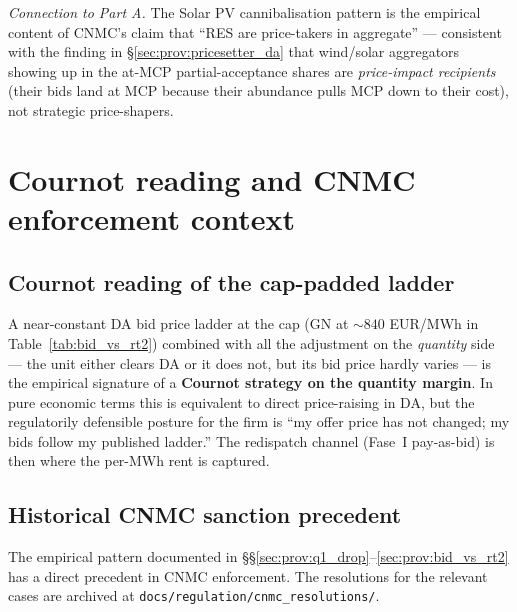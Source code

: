 \documentclass[11pt,a4paper]{article}
\begin{document}
\textit{Connection to Part A.} The Solar PV cannibalisation pattern is the empirical content of CNMC's claim that ``RES are price-takers in aggregate'' --- consistent with the finding in \S\ref{sec:prov:pricesetter_da} that wind/solar aggregators showing up in the at-MCP partial-acceptance shares are \emph{price-impact recipients} (their bids land at MCP because their abundance pulls MCP down to their cost), not strategic price-shapers.


\section{Cournot reading and CNMC enforcement context}\label{sec:prov:cournot_cnmc}

\subsection{Cournot reading of the cap-padded ladder}\label{sec:prov:cournot_cnmc:cournot}

A near-constant DA bid price ladder at the cap (GN at $\sim 840$ EUR/MWh in Table~\ref{tab:bid_vs_rt2}) combined with all the adjustment on the \emph{quantity} side --- the unit either clears DA or it does not, but its bid price hardly varies --- is the empirical signature of a \textbf{Cournot strategy on the quantity margin}. In pure economic terms this is equivalent to direct price-raising in DA, but the regulatorily defensible posture for the firm is ``my offer price has not changed; my bids follow my published ladder.'' The redispatch channel (Fase~I pay-as-bid) is then where the per-MWh rent is captured.

\subsection{Historical CNMC sanction precedent}\label{sec:prov:cournot_cnmc:sanctions}

The empirical pattern documented in \S\S\ref{sec:prov:q1_drop}--\ref{sec:prov:bid_vs_rt2} has a direct precedent in CNMC enforcement. The resolutions for the relevant cases are archived at \texttt{docs/regulation/cnmc\_resolutions/}.
\end{document}
